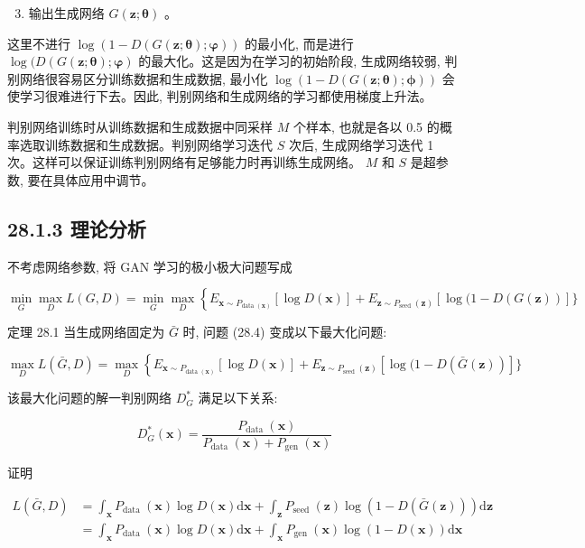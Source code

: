\documentclass[10pt]{article}
\begin{document}
\begin{enumerate}
  \setcounter{enumi}{2}
  \item 输出生成网络 $G(\boldsymbol{z} ; \boldsymbol{\theta})$ 。
\end{enumerate}

这里不进行 $\log (1-D(G(\boldsymbol{z} ; \boldsymbol{\theta}) ; \boldsymbol{\varphi}))$ 的最小化, 而是进行 $\log (D(G(\boldsymbol{z} ; \boldsymbol{\theta}) ; \boldsymbol{\varphi})$ 的最大化。这是因为在学习的初始阶段, 生成网络较弱, 判别网络很容易区分训练数据和生成数据, 最小化 $\log (1-D(G(\boldsymbol{z} ; \boldsymbol{\theta}) ; \boldsymbol{\phi}))$ 会使学习很难进行下去。因此, 判别网络和生成网络的学习都使用梯度上升法。

判别网络训练时从训练数据和生成数据中同采样 $M$ 个样本, 也就是各以 0.5 的概率选取训练数据和生成数据。判别网络学习迭代 $S$ 次后, 生成网络学习迭代 1 次。这样可以保证训练判别网络有足够能力时再训练生成网络。 $M$ 和 $S$ 是超参数, 要在具体应用中调节。

\subsection*{28.1.3 理论分析}
不考虑网络参数, 将 GAN 学习的极小极大问题写成


\begin{equation*}
\min _{G} \max _{D} L(G, D)=\min _{G} \max _{D}\left\{E_{\boldsymbol{x} \sim P_{\text {data }(\boldsymbol{x})}}[\log D(\boldsymbol{x})]+E_{\boldsymbol{z} \sim P_{\text {seed }}(\boldsymbol{z})}[\log (1-D(G(\boldsymbol{z}))]\}\right. \tag{28.4}
\end{equation*}


定理 28.1 当生成网络固定为 $\bar{G}$ 时, 问题 (28.4) 变成以下最大化问题:

$$
\max _{D} L(\bar{G}, D)=\max _{D}\left\{E_{\boldsymbol{x} \sim P_{\text {data }(\boldsymbol{x})}}[\log D(\boldsymbol{x})]+E_{\boldsymbol{z} \sim P_{\text {seed }}(\boldsymbol{z})}[\log (1-D(\bar{G}(\boldsymbol{z}))]\}\right.
$$

该最大化问题的解一判别网络 $D_{G}^{*}$ 满足以下关系:


\begin{equation*}
D_{G}^{*}(\boldsymbol{x})=\frac{P_{\text {data }}(\boldsymbol{x})}{P_{\text {data }}(\boldsymbol{x})+P_{\text {gen }}(\boldsymbol{x})} \tag{28.5}
\end{equation*}


证明


\begin{align*}
L(\bar{G}, D) & =\int_{\boldsymbol{x}} P_{\text {data }}(\boldsymbol{x}) \log D(\boldsymbol{x}) \mathrm{d} \boldsymbol{x}+\int_{\boldsymbol{z}} P_{\text {seed }}(\boldsymbol{z}) \log (1-D(\bar{G}(\boldsymbol{z}))) \mathrm{d} \boldsymbol{z} \\
& =\int_{\boldsymbol{x}} P_{\text {data }}(\boldsymbol{x}) \log D(\boldsymbol{x}) \mathrm{d} \boldsymbol{x}+\int_{\boldsymbol{x}} P_{\text {gen }}(\boldsymbol{x}) \log (1-D(\boldsymbol{x})) \mathrm{d} \boldsymbol{x} \tag{28.6}
\end{align*}
\end{document}
